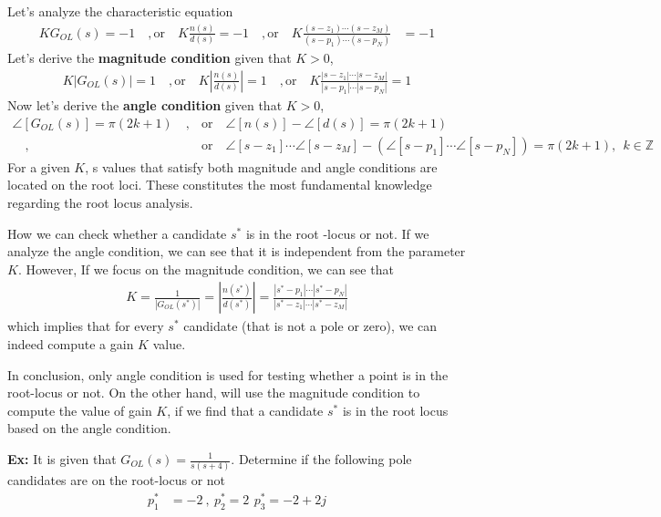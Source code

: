\documentclass[twoside]{article}
\begin{document}
Let's analyze the characteristic equation 
%
\begin{align*}
K G_{OL}(s) = -1 \quad , \mathrm{or} \quad K \frac{n(s)}{d(s)} = -1 
\quad , \mathrm{or} \quad 
K \frac{(s - z_1) \cdots (s - z_M)}{(s - p_1) \cdots (s - p_N)} 
&= -1
\end{align*}
%
Let's derive the \textbf{magnitude condition} given that $K > 0$,
%
\begin{align*}
K | G_{OL}(s) | = 1 \quad , \mathrm{or} \quad K  \left| \frac{n(s)}{d(s)} \right| = 1 
\quad , \mathrm{or} \quad 
K \frac{|s - z_1| \cdots |s - z_M|}{|s - p_1| \cdots |s - p_N|}  = 1
\end{align*}
%
Now let's derive the \textbf{angle condition} given that $K > 0$,
%
\begin{align*}
\angle [ G_{OL}(s) ] = \pi (2 k + 1) 
\quad ,  &\mathrm{or} \quad 
\angle [n(s)] - \angle [d(s)] = \pi (2 k + 1) 
\\
\quad , &\mathrm{or} \quad 
\angle [s - z_1] \cdots \angle [s - z_M] - \left( \angle [s - p_1] \cdots \angle [s - p_N] \right)
= \pi (2 k + 1), 
\ \ k \in \mathbb{Z} 
\end{align*}
%
For a given $K$, s values that satisfy both magnitude and angle
conditions are located on the root loci. These constitutes the most
fundamental knowledge regarding the root locus analysis.

How we can check whether a candidate $s^*$ is in the root -locus or not.
If we analyze the angle condition, we can see that it is independent 
from the parameter $K$. However, If we focus on the magnitude condition, 
we can see that 
%
\begin{align*}
K = \frac{1}{| G_{OL}(s^*) |} = \left| \frac{n(s^*)}{d(s^*)} \right| = 
\frac{|s^* - p_1| \cdots |s^* - p_N|}{|s^* - z_1| \cdots |s^* - z_M|} 
\end{align*}
%
which implies that for every $s^*$ candidate (that is not a pole or zero), 
we can indeed compute a gain $K$ value.

In conclusion, only angle condition is used for testing 
whether a point is in the root-locus or not. On the other hand, 
will use the magnitude condition to compute the 
value of gain $K$, if we find that a candidate $s^*$
is in the root locus based on the angle condition.

\newpage

\textbf{Ex:} It is given that $G_{OL}(s) = \frac{1}{s (s+4)}$.
Determine if the following pole candidates are on the 
root-locus or not
%
\begin{align*}
	p_1^* &= -2  \ , \  p_2^* = 2 \,\ p_3^* = -2 + 2 j
\end{align*}
 
\end{document}
